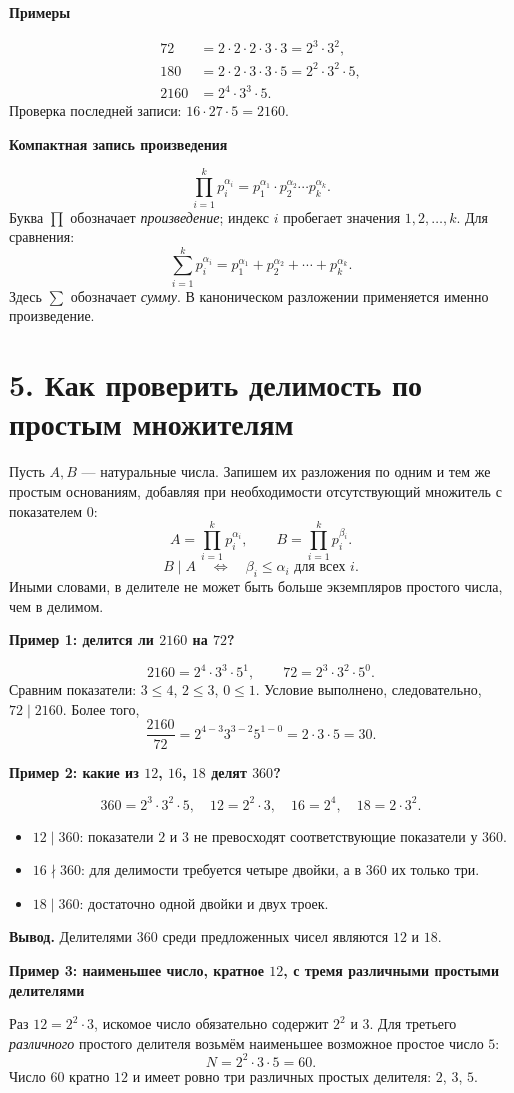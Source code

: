 \documentclass[a4paper,12pt]{article}
\newcommand{\important}[1]{\textcolor{deepaccent}{\textbf{#1}}}
\newcommand{\sectiontitle}[1]{\needspace{5\baselineskip}\section*{\color{deepaccent}#1}}
\newcommand{\subtopic}[1]{\medskip\textbf{\color{accent}#1}\par\vspace{-2pt}}
\begin{document}
\subtopic{Примеры}
\begin{align*}
72&=2\cdot2\cdot2\cdot3\cdot3=\boxed{2^3\cdot3^2},\\
180&=2\cdot2\cdot3\cdot3\cdot5=\boxed{2^2\cdot3^2\cdot5},\\
2160&=\boxed{2^4\cdot3^3\cdot5}.
\end{align*}
Проверка последней записи: $16\cdot27\cdot5=2160$.

\subtopic{Компактная запись произведения}
\[
\prod_{i=1}^{k}p_i^{\alpha_i}=p_1^{\alpha_1}\cdot p_2^{\alpha_2}\cdots p_k^{\alpha_k}.
\]
Буква $\prod$ обозначает \emph{произведение}; индекс $i$ пробегает значения $1,2,\ldots,k$. Для сравнения:
\[
\sum_{i=1}^{k}p_i^{\alpha_i}=p_1^{\alpha_1}+p_2^{\alpha_2}+\cdots+p_k^{\alpha_k}.
\]
Здесь $\sum$ обозначает \emph{сумму}. В каноническом разложении применяется именно произведение.
\clearpage

\sectiontitle{5. Как проверить делимость по простым множителям}
Пусть $A,B$ --- натуральные числа. Запишем их разложения по одним и тем же простым основаниям, добавляя при необходимости отсутствующий множитель с показателем $0$:
\[
A=\prod_{i=1}^{k}p_i^{\alpha_i},\qquad
B=\prod_{i=1}^{k}p_i^{\beta_i}.
\]
\[
\boxed{B\mid A\quad\Longleftrightarrow\quad
\beta_i\le\alpha_i\text{ для всех }i.}
\]
Иными словами, в делителе не может быть больше экземпляров простого числа, чем в делимом.

\subtopic{Пример 1: делится ли $2160$ на $72$?}
\[
2160=2^4\cdot3^3\cdot5^1,\qquad72=2^3\cdot3^2\cdot5^0.
\]
Сравним показатели: $3\le4$, $2\le3$, $0\le1$. Условие выполнено, следовательно, $72\mid2160$. Более того,
\[
\frac{2160}{72}=2^{4-3}3^{3-2}5^{1-0}=2\cdot3\cdot5=\boxed{30}.
\]

\subtopic{Пример 2: какие из $12$, $16$, $18$ делят $360$?}
\[
360=2^3\cdot3^2\cdot5,\quad
12=2^2\cdot3,\quad16=2^4,\quad18=2\cdot3^2.
\]
\begin{itemize}
\item $12\mid360$: показатели $2$ и $3$ не превосходят соответствующие показатели у $360$.
\item $16\nmid360$: для делимости требуется четыре двойки, а в $360$ их только три.
\item $18\mid360$: достаточно одной двойки и двух троек.
\end{itemize}
\important{Вывод.} Делителями $360$ среди предложенных чисел являются $12$ и $18$.

\subtopic{Пример 3: наименьшее число, кратное $12$, с тремя различными простыми делителями}
Раз $12=2^2\cdot3$, искомое число обязательно содержит $2^2$ и $3$. Для третьего \emph{различного} простого делителя возьмём наименьшее возможное простое число $5$:
\[
\boxed{N=2^2\cdot3\cdot5=60.}
\]
Число $60$ кратно $12$ и имеет ровно три различных простых делителя: $2$, $3$, $5$.
\end{document}
